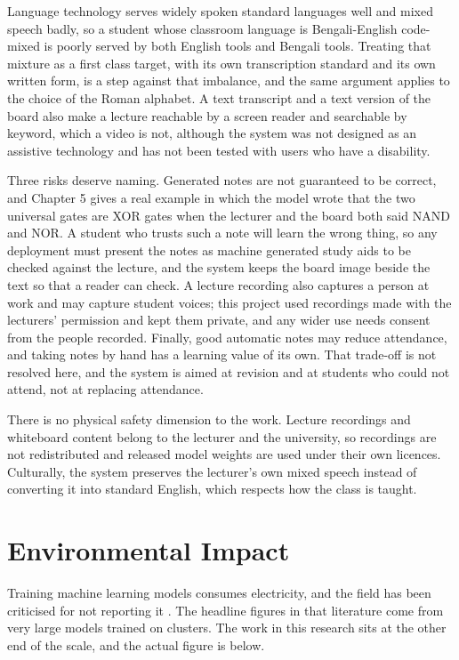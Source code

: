 Language technology serves widely spoken standard languages well and mixed speech badly,
so a student whose classroom language is Bengali-English code-mixed is poorly served by
both English tools and Bengali tools. Treating that mixture as a first class target, with
its own transcription standard and its own written form, is a step against that imbalance,
and the same argument applies to the choice of the Roman alphabet. A text transcript and a
text version of the board also make a lecture reachable by a screen reader and searchable
by keyword, which a video is not, although the system was not designed as an assistive
technology and has not been tested with users who have a disability.

Three risks deserve naming. Generated notes are not guaranteed to be correct, and Chapter
5 gives a real example in which the model wrote that the two universal gates are XOR gates
when the lecturer and the board both said NAND and NOR. A student who trusts such a note
will learn the wrong thing, so any deployment must present the notes as machine generated
study aids to be checked against the lecture, and the system keeps the board image beside
the text so that a reader can check. A lecture recording also captures a person at work
and may capture student voices; this project used recordings made with the lecturers'
permission and kept them private, and any wider use needs consent from the people
recorded. Finally, good automatic notes may reduce attendance, and taking notes by hand
has a learning value of its own. That trade-off is not resolved here, and the system is
aimed at revision and at students who could not attend, not at replacing
attendance.

There is no physical safety dimension to the work. Lecture recordings and whiteboard
content belong to the lecturer and the university, so recordings are not redistributed and
released model weights are used under their own licences. Culturally, the system preserves
the lecturer's own mixed speech instead of converting it into standard English, which
respects how the class is taught.

\section{Environmental Impact}

Training machine learning models consumes electricity, and the field has been criticised
for not reporting it \cite{strubell2019energy}. The headline figures in that literature
come from very large models trained on clusters. The work in this research sits at the
other end of the scale, and the actual figure is below.

